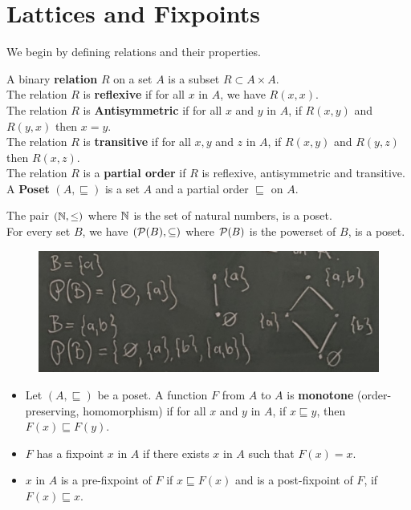 \section{Lattices and Fixpoints}
We begin by defining relations and their properties. 
\begin{definition}
    A binary \textbf{relation} $R$ on a set $A$ is a subset $R \subset A\times A$. \\
    The relation $R$ is \textbf{reflexive} if for all $x$ in $A$, we have $R(x,x)$.\\
    The relation $R$ is \textbf{Antisymmetric} if for all $x$ and $y$ in $A$, if $R(x,y)$ and $R(y,x)$ then $x=y$. \\
    The relation $R$ is \textbf{transitive} if for all $x,y$ and $z$ in $A$, if $R(x,y)$ and $R(y,z)$ then $R(x,z)$.\\
    The relation $R$ is a \textbf{partial order} if $R$ is reflexive, antisymmetric and transitive. \\
    A \textbf{Poset} $(A,\sqsubseteq)$ is a set $A$ and a partial order $\sqsubseteq$ on $A$.
\end{definition}
\begin{example}
    The pair $(\N,\leq)$ where $\N$ is the set of natural numbers, is a poset.\\
    For every set $B$, we have $(\P(B),\subseteq)$ where $\P(B)$ is the powerset of $B$, is a poset.
    \begin{figure}[h]
        \centering
        \includegraphics[width=0.7\linewidth]{images/poset.png}
    \end{figure}
\end{example}
\begin{definition}
    \begin{itemize}
    \item Let $(A,\sqsubseteq)$ be a poset. A function $F$ from $A$ to $A$ is \textbf{monotone} (order-preserving, homomorphism) if for all $x$ and $y$ in $A$, if $x \sqsubseteq y$, then $F(x) \sqsubseteq F(y)$.
    \item $F$ has a fixpoint $x$ in $A$ if there exists $x$ in $A$ such that $F(x)=x$. 
    \item $x$ in $A$ is a pre-fixpoint of $F$ if $x \sqsubseteq F(x)$ and is a post-fixpoint of $F$, if $F(x) \sqsubseteq x$. 
    \end{itemize}
\end{definition}
